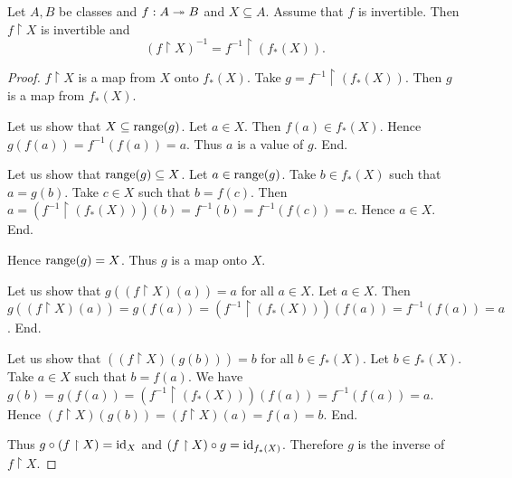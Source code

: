 \documentclass[../../set-theory/set-theory.tex]{subfiles}
\begin{document}
  \begin{forthel}
    \begin{proposition}
      Let $A, B$ be classes and $f : A \twoheadrightarrow B$ and $X \subseteq A$.
      Assume that $f$ is invertible.
      Then $f \restriction X$ is invertible and
      \[ (f\restriction X)^{-1} = f^{-1} \restriction (f_{*}(X)). \]
    \end{proposition}
    \begin{proof}
      $f \restriction X$ is a map from $X$ onto $f_{*}(X)$.
      Take $g = f^{-1} \restriction (f_{*}(X))$.
      Then $g$ is a map from $f_{*}(X)$.

      Let us show that $X \subseteq \operatorname{range}(g)$.
        Let $a \in X$.
        Then $f(a) \in f_{*}(X)$.
        Hence $g(f(a)) = f^{-1}(f(a)) = a$.
        Thus $a$ is a value of $g$.
      End.

      Let us show that $\operatorname{range}(g) \subseteq X$.
        Let $a \in \operatorname{range}(g)$.
        Take $b \in f_{*}(X)$ such that $a = g(b)$.
        Take $c \in X$ such that $b = f(c)$.
        Then $a = (f^{-1} \restriction (f_{*}(X)))(b) = f^{-1}(b) = f^{-1}(f(c)) = c$.
        Hence $a \in X$.
      End.

      Hence $\operatorname{range}(g) = X$.
      Thus $g$ is a map onto $X$.

      Let us show that $g((f \restriction X)(a)) = a$ for all $a \in X$.
        Let $a \in X$.
        Then $g((f \restriction X)(a)) = g(f(a)) = (f^{-1} \restriction (f_{*}(X)))(f(a)) = f^{-1}(f(a)) = a$.
      End.

      Let us show that $((f \restriction X)(g(b))) = b$ for all $b \in f_{*}(X)$.
        Let $b \in f_{*}(X)$.
        Take $a \in X$ such that $b = f(a)$.
        We have $g(b) = g(f(a)) = (f^{-1} \restriction (f_{*}(X)))(f(a)) = f^{-1}(f(a)) = a$.
        Hence $(f \restriction X)(g(b)) = (f \restriction X)(a) = f(a) = b$.
      End.

      Thus $g \circ (f \restriction X) = \operatorname{id}_{X}$ and $(f \restriction X) \circ g = \operatorname{id}_{f_{*}(X)}$.
      Therefore $g$ is the inverse of $f \restriction X$.
    \end{proof}
  \end{forthel}
\end{document}
